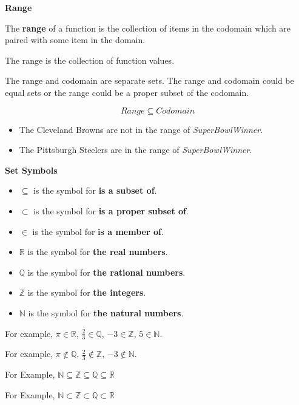 \documentclass{ximera}
\begin{document}
\begin{definition} \textbf{\textcolor{green!50!black}{Range}} 

The \textbf{range} of a function is the collection of items in the codomain which are paired with some item in the domain.  


The range is the collection of function values.

\end{definition}

The range and codomain are separate sets.  The range and codomain could be equal sets or the range could be a proper subset of the codomain. 

\[  Range \subseteq Codomain\]

\begin{itemize}
\item The Cleveland Browns are not in the range of \textit{SuperBowlWinner}.  
\item The Pittsburgh Steelers are in the range of \textit{SuperBowlWinner}.
\end{itemize}



\begin{notation}\textbf{\textcolor{red!50!green}{Set Symbols}} 

\begin{itemize}
\item $\subseteq$ is the symbol for \textbf{is a subset of}.
\item $\subset$ is the symbol for \textbf{is a proper subset of}.
\item $\in$ is the symbol for \textbf{is a member of}.
\item $\mathbb{R}$ is the symbol for \textbf{the real numbers}.
\item $\mathbb{Q}$ is the symbol for \textbf{the rational numbers}.
\item $\mathbb{Z}$ is the symbol for \textbf{the integers}.
\item $\mathbb{N}$ is the symbol for \textbf{the natural numbers}.
\end{itemize}


For example, $\pi \in \mathbb{R}$, $\tfrac{2}{3} \in \mathbb{Q}$, $-3 \in \mathbb{Z}$, $5 \in \mathbb{N}$. 

For example, $\pi \notin \mathbb{Q}$, $\tfrac{2}{3} \notin \mathbb{Z}$, $-3 \notin \mathbb{N}$. 

For Example,  $\mathbb{N} \subseteq \mathbb{Z} \subseteq \mathbb{Q} \subseteq \mathbb{R}$ 

For Example,  $\mathbb{N} \subset \mathbb{Z} \subset \mathbb{Q} \subset \mathbb{R}$


\end{notation}
\end{document}
